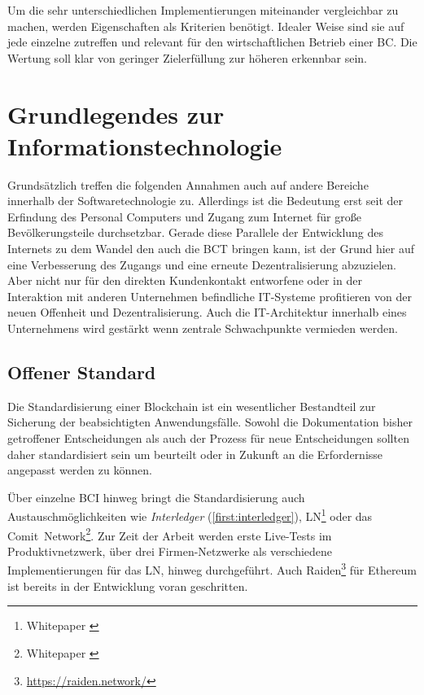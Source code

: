 Um die sehr unterschiedlichen Implementierungen miteinander vergleichbar zu machen, werden Eigenschaften als Kriterien benötigt. Idealer Weise sind sie auf jede einzelne zutreffen und relevant für den wirtschaftlichen Betrieb einer \gls{BC}.
Die Wertung soll klar von geringer Zielerfüllung zur höheren erkennbar sein.


\section{Grundlegendes zur Informationstechnologie}\label{krit:it}

Grundsätzlich treffen die folgenden Annahmen auch auf andere Bereiche innerhalb der Softwaretechnologie zu.
Allerdings ist die Bedeutung erst seit der Erfindung des Personal Computers und Zugang zum Internet für große Bevölkerungsteile durchsetzbar.
Gerade diese Parallele der Entwicklung des Internets zu dem Wandel den auch die \gls{BCT} bringen kann, ist der Grund hier auf eine Verbesserung des Zugangs und eine erneute Dezentralisierung abzuzielen.
Aber nicht nur für den direkten Kundenkontakt entworfene oder in der Interaktion mit anderen Unternehmen befindliche IT-Systeme profitieren von der neuen Offenheit und Dezentralisierung. Auch die IT-Architektur innerhalb eines Unternehmens wird gestärkt wenn zentrale Schwachpunkte vermieden werden. 

%
\subsection{Offener Standard}\label{krit:openstandard}

Die Standardisierung einer Blockchain ist ein wesentlicher Bestandteil zur Sicherung der beabsichtigten Anwendungsfälle.
Sowohl die Dokumentation bisher getroffener Entscheidungen als auch der Prozess für neue Entscheidungen sollten daher standardisiert sein um beurteilt oder in Zukunft an die Erfordernisse angepasst werden zu können.

Über einzelne \gls{BCI} hinweg bringt die Standardisierung auch Austauschmöglichkeiten wie \emph{Interledger} (\ref{first:interledger}), \gls{LN}\footnote{Whitepaper \autocite{p:lightning}} oder das Comit~Network\footnote{Whitepaper \autocite{p:comit}}.
Zur Zeit der Arbeit werden erste Live-Tests im Produktivnetzwerk, über drei Firmen-Netzwerke als verschiedene Implementierungen für das \gls{LN}, hinweg durchgeführt. Auch Raiden\footnote{\url{https://raiden.network/}} für Ethereum ist bereits in der Entwicklung voran geschritten.

